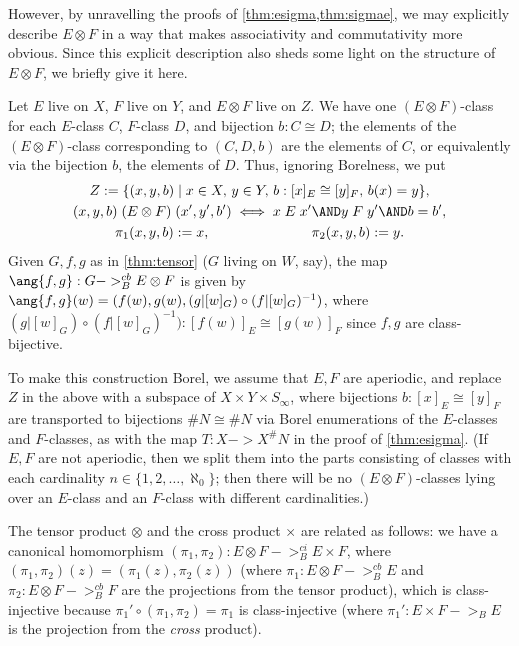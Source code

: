 \documentclass[11pt]{article}
\begin{document}
\begin{remark}
\label{thm:tensor-alt}
However, by unravelling the proofs of \cref{thm:esigma,thm:sigmae}, we may explicitly describe $E \otimes F$ in a way that makes associativity and commutativity more obvious.  Since this explicit description also sheds some light on the structure of $E \otimes F$, we briefly give it here.

Let $E$ live on $X$, $F$ live on $Y$, and $E \otimes F$ live on $Z$.  We have one $(E \otimes F)$-class for each $E$-class $C$, $F$-class $D$, and bijection $b : C \cong D$; the elements of the $(E \otimes F)$-class corresponding to $(C, D, b)$ are the elements of $C$, or equivalently via the bijection $b$, the elements of $D$.  Thus, ignoring Borelness, we put
\begin{gather*}
Z := \{(x, y, b) \mid x \in X,\, y \in Y,\, b : [x]_E \cong [y]_F,\, b(x) = y\}, \\
(x, y, b) \mathrel{(E \otimes F)} (x', y', b') \iff x \mathrel{E} x' \AND y \mathrel{F} y' \AND b = b', \\
\pi_1(x, y, b) := x, \hspace{1in} \pi_2(x, y, b) := y.
\end{gather*}
Given $G, f, g$ as in \cref{thm:tensor} ($G$ living on $W$, say), the map $\ang{f, g} : G ->_B^{cb} E \otimes F$ is given by $\ang{f, g}(w) = (f(w), g(w), (g|[w]_G) \circ (f|[w]_G)^{-1})$, where $(g|[w]_G) \circ (f|[w]_G)^{-1}) : [f(w)]_E \cong [g(w)]_F$ since $f, g$ are class-bijective.

To make this construction Borel, we assume that $E, F$ are aperiodic, and replace $Z$ in the above with a subspace of $X \times Y \times S_\infty$, where bijections $b : [x]_E \cong [y]_F$ are transported to bijections $\#N \cong \#N$ via Borel enumerations of the $E$-classes and $F$-classes, as with the map $T : X -> X^\#N$ in the proof of \cref{thm:esigma}.  (If $E, F$ are not aperiodic, then we split them into the parts consisting of classes with each cardinality $n \in \{1, 2, \dotsc, \aleph_0\}$; then there will be no $(E \otimes F)$-classes lying over an $E$-class and an $F$-class with different cardinalities.)
\end{remark}

The tensor product $\otimes$ and the cross product $\times$ are related as follows: we have a canonical homomorphism $(\pi_1, \pi_2) : E \otimes F ->_B^{ci} E \times F$, where $(\pi_1, \pi_2)(z) = (\pi_1(z), \pi_2(z))$ (where $\pi_1 : E \otimes F ->_B^{cb} E$ and $\pi_2 : E \otimes F ->_B^{cb} F$ are the projections from the tensor product), which is class-injective because $\pi_1' \circ (\pi_1, \pi_2) = \pi_1$ is class-injective (where $\pi_1' : E \times F ->_B E$ is the projection from the \emph{cross} product).
\end{document}
